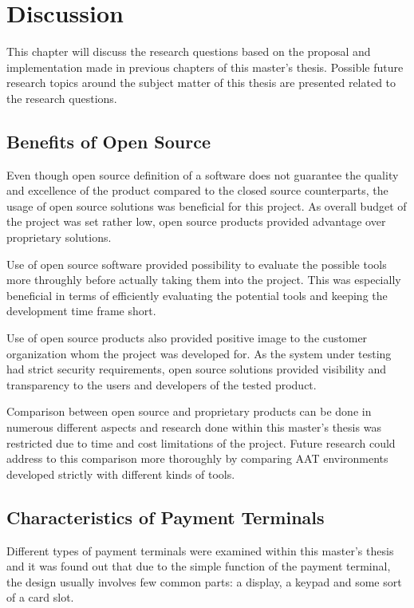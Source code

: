
\chapter{Discussion}
\label{chapter:discussion}

This chapter will discuss the research questions based on the proposal and implementation made in previous chapters of this master's thesis. Possible future research topics around the subject matter of this thesis are presented related to the research questions.

\section{Benefits of Open Source}

Even though open source definition of a software does not guarantee the quality and excellence of the product compared to the closed source counterparts, the usage of open source solutions was beneficial for this project. As overall budget of the project was set rather low, open source products provided advantage over proprietary solutions.

Use of open source software provided possibility to evaluate the possible tools more throughly before actually taking them into the project. This was especially beneficial in terms of efficiently evaluating the potential tools and keeping the development time frame short. 

Use of open source products also provided positive image to the customer organization whom the project was developed for. As the system under testing had strict security requirements, open source solutions provided visibility and transparency to the users and developers of the tested product.

Comparison between open source and proprietary products can be done in numerous different aspects and research done within this master's thesis was restricted due to time and cost limitations of the project. Future research could address to this comparison more thoroughly by comparing AAT environments developed strictly with different kinds of tools.

\section{Characteristics of Payment Terminals}

Different types of payment terminals were examined within this master's thesis and it was found out that due to the simple function of the payment terminal, the design usually involves few common parts: a display, a keypad and some sort of a card slot.

